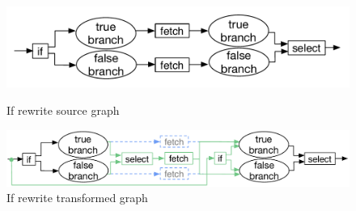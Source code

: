 \begin{figure}
	\includegraphics[width=\textwidth]{Figures/basic-if-rewrite-original}
	\caption{If rewrite source graph}
	\label{fig:if-rewrite-graph-before}
	\includegraphics[width=\textwidth]{Figures/basic-if-rewrite}
	\caption{If rewrite transformed graph}
	\label{fig:if-rewrite-graph-after}
\end{figure}
